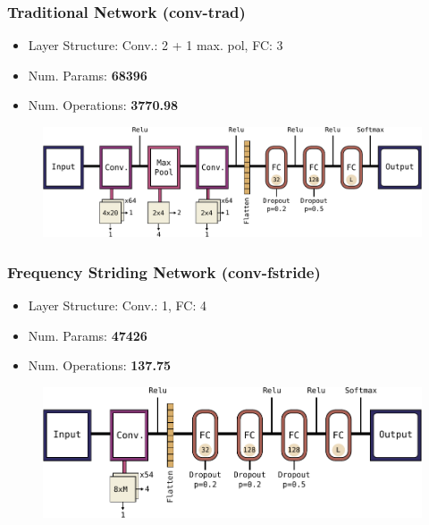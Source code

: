 \begin{frame}
  \frametitle{Traditional Network (conv-trad)}
  \vspace{-0.5cm}
  \begin{itemize}
    \small
    \item Layer Structure: Conv.: 2 + 1 max. pol, FC: 3 
    \item Num. Params: \textbf{\num{68396}}
    \item Num. Operations: \textbf{\SI{3770.98}{\kilo\ops}}
  \end{itemize}
  \begin{figure} \includegraphics[height=0.35\textheight]{../4_nn/figs/nn_arch_cnn_trad.pdf} \end{figure}
\end{frame}

\begin{frame}
  \frametitle{Frequency Striding Network (conv-fstride)}
  \vspace{-0.5cm}
  \begin{itemize}
    \small
    \item Layer Structure: Conv.: 1, FC: 4
    \item Num. Params: \textbf{\num{47426}} 
    \item Num. Operations: \textbf{\SI{137.75}{\kilo\ops}}
  \end{itemize}
  \begin{figure} \includegraphics[height=0.35\textheight]{../4_nn/figs/nn_arch_cnn_fstride.pdf} \end{figure}
\end{frame}

